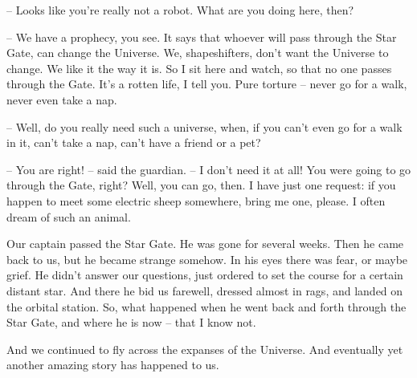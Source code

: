 \documentclass[ebook,oneside,final,openright]{memoir}
\begin{document}
– Looks like you’re really not a robot. What are you doing here, then?\par
– We have a prophecy, you see. It says that whoever will pass through the Star Gate, can change the Universe. We, shapeshifters, don’t want the Universe to change. We like it the way it is. So I sit here and watch, so that no one passes through the Gate. It’s a rotten life, I tell you. Pure torture – never go for a walk, never even take a nap.\par
– Well, do you really need such a universe, when, if you can’t even go for a walk in it, can’t take a nap, can’t have a friend or a pet?\par
– You are right! – said the guardian. – I don’t need it at all! You were going to go through the Gate, right? Well, you can go, then. I have just one request: if you happen to meet some electric sheep somewhere, bring me one, please. I often dream of such an animal.\par
Our captain passed the Star Gate. He was gone for several weeks. Then he came back to us, but he became strange somehow. In his eyes there was fear, or maybe grief. He didn’t answer our questions, just ordered to set the course for a certain distant star. And there he bid us farewell, dressed almost in rags, and landed on the orbital station. So, what happened when he went back and forth through the Star Gate, and where he is now – that I know not. \par
\par
 And we continued to fly across the expanses of the Universe. And eventually yet another amazing story has happened to us.
\end{document}
